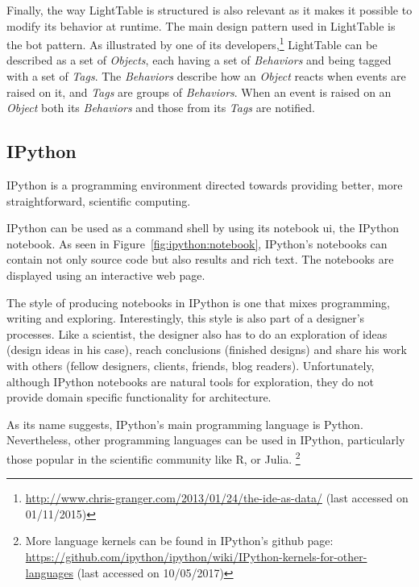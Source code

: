 Finally, the way LightTable is structured is also relevant as it makes it possible to modify its behavior at runtime.
The main design pattern used in LightTable is the \gls{bot} pattern. %
As illustrated by one of its developers,\footnote{\url{http://www.chris-granger.com/2013/01/24/the-ide-as-data/} (last accessed on 01/11/2015)} LightTable can be described as a set of \emph{Objects}, each having a set of \emph{Behaviors} and being tagged with a set of \emph{Tags}.
The \emph{Behaviors} describe how an \emph{Object} reacts when events are raised on it, and \emph{Tags} are groups of \emph{Behaviors}.
When an event is raised on an \emph{Object} both its \emph{Behaviors} and those from its \emph{Tags} are notified.


\subsection{IPython}
\label{section:ipython:related}
IPython\cite{PER-GRA:2007} is a programming environment directed towards providing better, more straightforward, scientific computing.

IPython can be used as a command shell by using its notebook \gls{ui}, the IPython notebook.
As seen in Figure~\ref{fig:ipython:notebook}, IPython's notebooks can contain not only source code but also results and rich text.
The notebooks are displayed using an interactive web page.

The style of producing notebooks in IPython is one that mixes programming, writing and exploring.
Interestingly, this style is also part of a designer's processes.
Like a scientist, the designer also has to do an exploration of ideas (design ideas in his case), reach conclusions (finished designs) and share his work with others (fellow designers, clients, friends, blog readers).
Unfortunately, although IPython notebooks are natural tools for exploration, they do not provide domain specific functionality for architecture.

As its name suggests, IPython's main programming language is Python\cite{rossum2003python}.
Nevertheless, other programming languages can be used in IPython, particularly those popular in the scientific community like R, or Julia.%
\footnote{More language kernels can be found in IPython's github page: \url{https://github.com/ipython/ipython/wiki/IPython-kernels-for-other-languages} (last accessed on 10/05/2017)}

